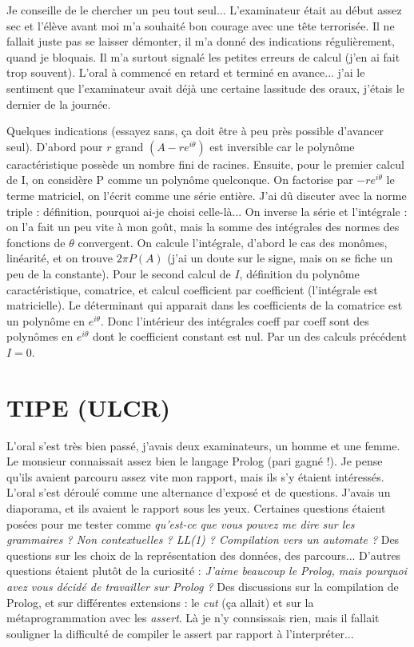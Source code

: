 \documentclass[french,a4paper, 12pt]{article}
\begin{document}
Je conseille de le chercher un peu tout seul... L'examinateur était au début assez sec et l'élève avant moi m'a souhaité bon courage avec une tête terrorisée. Il ne fallait juste pas se laisser démonter, il m'a donné des indications régulièrement, quand je bloquais. Il m'a surtout signalé les petites erreurs de calcul (j'en ai fait trop souvent). L'oral à commencé en retard et terminé en avance... j'ai le sentiment que l'examinateur avait déjà une certaine lassitude des oraux, j'étais le dernier de la journée.

Quelques indications (essayez sans, ça doit être à peu près possible d'avancer seul). D'abord pour $r$ grand $(A - re^{i\theta})$ est inversible car le polynôme caractéristique possède un nombre fini de racines. Ensuite, pour le premier calcul de I, on considère P comme un polynôme quelconque. On factorise par $-re^{i\theta}$ le terme matriciel, on l'écrit comme une série entière. J'ai dû discuter avec la norme triple : définition, pourquoi ai-je choisi celle-là... On inverse la série et l'intégrale : on l'a fait un peu vite à mon goût, mais la somme des intégrales des normes des fonctions de $\theta$ convergent. On calcule l'intégrale, d'abord le cas des monômes, linéarité, et on trouve $2\pi P(A)$ (j'ai un doute sur le signe, mais on se fiche un peu de la constante). Pour le second calcul de $I$, définition du polynôme caractéristique, comatrice, et calcul coefficient par coefficient (l'intégrale est matricielle). Le déterminant qui apparait dans les coefficients de la comatrice est un polynôme en $e^{i\theta}$. Donc l'intérieur des intégrales coeff par coeff sont des polynômes en $e^{i\theta}$ dont le coefficient constant est nul. Par un des calculs précédent $I = 0$.

\section*{TIPE (ULCR)}

L'oral s'est très bien passé, j'avais deux examinateurs, un homme et une femme. Le monsieur connaissait assez bien le langage Prolog (pari gagné !). Je pense qu'ils avaient parcouru assez vite mon rapport, mais ils s'y étaient intéressés. L'oral s'est déroulé comme une alternance d'exposé et de questions. J'avais un diaporama, et ils avaient le rapport sous les yeux. Certaines questions étaient posées pour me tester comme \emph{qu'est-ce que vous pouvez me dire sur les grammaires ? Non contextuelles ? LL(1) ? Compilation vers un automate ?} Des questions sur les choix de la représentation des données, des parcours... D'autres questions étaient plutôt de la curiosité : \emph{J'aime beaucoup le Prolog, mais pourquoi avez vous décidé de travailler sur Prolog ?} Des discussions sur la compilation de Prolog, et sur différentes extensions : le \emph{cut} (ça allait) et sur la métaprogrammation avec les \emph{assert}. Là je n'y connsissais rien, mais il fallait souligner la difficulté de compiler le assert par rapport à l'interpréter...
\end{document}
